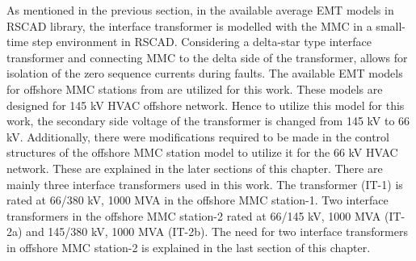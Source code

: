 As mentioned in the previous section, in the available average \gls{EMT} models in RSCAD library, the interface transformer is modelled with the \gls{MMC} in a small-time step environment in RSCAD. Considering a delta-star type interface transformer and connecting \gls{MMC} to the delta side of the transformer, allows for isolation of the zero sequence currents during faults. The available \gls{EMT} models for offshore \gls{MMC} stations from \cite{vrana2013cigre} are utilized for this work. These models are designed for 145 kV \gls{HVAC} offshore network. Hence to utilize this model for this work, the secondary side voltage of the transformer is changed from 145 kV to 66 kV. Additionally, there were modifications required to be made in the control structures of the offshore \gls{MMC} station model to utilize it for the 66 kV \gls{HVAC} network. These are explained in the later sections of this chapter. There are mainly three interface transformers used in this work. The transformer (IT-1) is rated at 66/380 kV, 1000 MVA in the offshore \gls{MMC} station-1. Two interface transformers in the offshore \gls{MMC} station-2 rated at 66/145 kV, 1000 MVA (IT-2a) and 145/380 kV, 1000 MVA (IT-2b). The need for two interface transformers in offshore \gls{MMC} station-2 is explained in the last section of this chapter.

